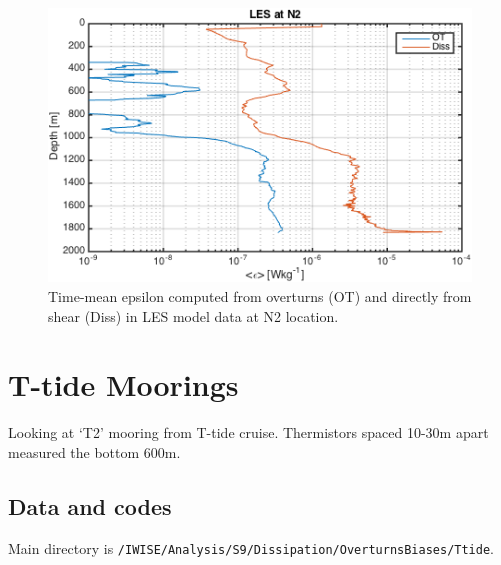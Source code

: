 \documentclass[11pt]{article}
\begin{document}
\begin{figure}[htbp]
\includegraphics[scale=0.8]{LES_N2_OTvsDirectProfiles.png}
\caption{Time-mean epsilon computed from overturns (OT) and directly from shear (Diss) in LES model data at N2 location.}
\label{}
\end{figure}





\newpage
\clearpage
\section{T-tide Moorings}

Looking at `T2' mooring from T-tide cruise. Thermistors spaced 10-30m apart measured the bottom 600m.

\subsection{Data and codes}

Main directory is \verb+/IWISE/Analysis/S9/Dissipation/OverturnsBiases/Ttide+. 
\end{document}
